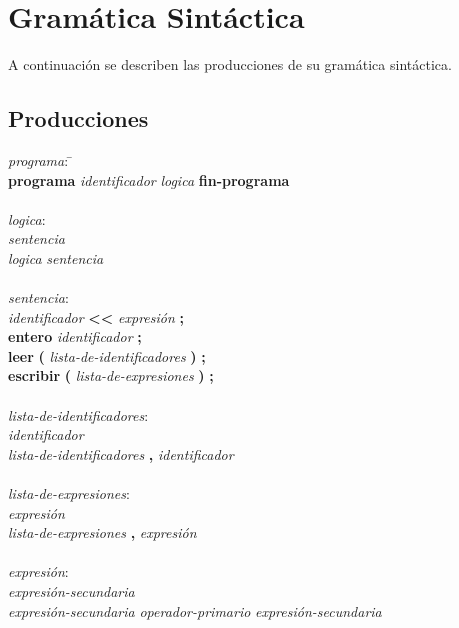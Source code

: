 
\section{Gramática Sintáctica}

A continuación se describen las producciones de su gramática sintáctica.

\subsection{Producciones}

\begin{tabbing}

\textit{programa}: \= \+ \\
    \textbf{programa} \textit{identificador}
    \textit{logica}
    \textbf{fin-programa} \\

\- \\ \textit{logica}: \+ \\
    \textit{sentencia} \\
    \textit{logica} \textit{sentencia} \\

\- \\ \textit{sentencia}: \+ \\
    \textit{identificador} \textbf{<}\textbf{<} \textit{expresión} \textbf{;}\\
    \textbf{entero} \textit{identificador} \textbf{;}\\
    \textbf{leer} \textbf{(} \textit{lista-de-identificadores} \textbf{)} \textbf{;}\\
    \textbf{escribir} \textbf{(} \textit{lista-de-expresiones} \textbf{)} \textbf{;}\\

\- \\ \textit{lista-de-identificadores}: \+ \\
    \textit{identificador} \\
    \textit{lista-de-identificadores} \textbf{,} \textit{identificador} \\

\- \\ \textit{lista-de-expresiones}: \+ \\
    \textit{expresión} \\
    \textit{lista-de-expresiones} \textbf{,} \textit{expresión} \\

\- \\ \textit{expresión}: \+ \\
    \textit{expresión-secundaria} \\
    \textit{expresión-secundaria} \textit{operador-primario} \textit{expresión-secundaria}\\


\end{tabbing}
